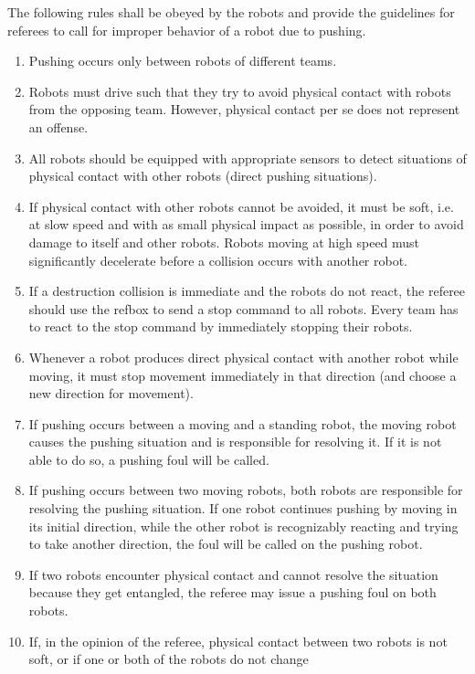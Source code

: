 \documentclass[12pt,twoside]{article}
\begin{document}
The following rules shall be obeyed by the robots and provide the
guidelines for referees to call for improper behavior of a robot due
to pushing.

\begin{enumerate}
\item Pushing occurs only between robots of different teams.
\item Robots must drive such that they try to avoid physical contact
  with robots from the opposing team. However, physical contact per se
  does not represent an offense.
\item All robots should be equipped with appropriate sensors to detect
  situations of physical contact with other robots (direct pushing
  situations).
\item If physical contact with other robots cannot be avoided, it must
  be soft, i.e. at slow speed and with as small physical impact as
  possible, in order to avoid damage to itself and other
  robots. Robots moving at high speed must significantly decelerate
  before a collision occurs with another robot.
\item If a destruction collision is immediate and the robots do not
  react, the referee should use the refbox to send a stop command to
  all robots. Every team has to react to the stop command by
  immediately stopping their robots.
\item Whenever a robot produces direct physical contact with another
  robot while moving, it must stop movement immediately in that
  direction (and choose a new direction for movement).
\item If pushing occurs between a moving and a standing robot, the
  moving robot causes the pushing situation and is responsible for
  resolving it. If it is not able to do so, a pushing foul will be
  called.
\item If pushing occurs between two moving robots, both robots are
  responsible for resolving the pushing situation. If one robot
  continues pushing by moving in its initial direction, while the
  other robot is recognizably reacting and trying to take another
  direction, the foul will be called on the pushing robot.
\item If two robots encounter physical contact and cannot resolve the
  situation because they get entangled, the referee may issue a
  pushing foul on both robots.
\item If, in the opinion of the referee, physical contact between two
  robots is not soft, or if one or both of the robots do not change

\end{enumerate}
\end{document}
